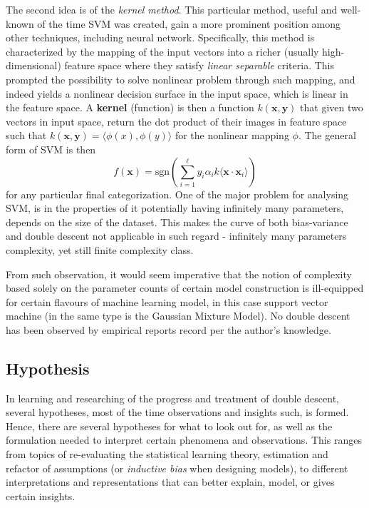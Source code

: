 \documentclass[10pt]{article} %
\begin{document}
The second idea is of the \textit{kernel method}. This particular method, useful and well-known of the time SVM was created, gain a more prominent position among other techniques, including neural network. Specifically, this method is characterized by the mapping of the input vectors into a richer (usually high-dimensional) feature space where they satisfy \textit{linear separable} criteria. This prompted the possibility to solve nonlinear problem through such mapping, and indeed yields a nonlinear decision surface in the input space, which is linear in the feature space. A \textbf{kernel} (function) is then a function $k(\mathbf{x},\mathbf{y})$ that given two vectors in input space, return the dot product of their images in feature space such that $k(\mathbf{x},\mathbf{y})=\langle \phi(x), \phi(y) \rangle$ for the nonlinear mapping $\phi$. The general form of SVM is then 
\begin{equation}
    f(\mathbf{x}) = \mathrm{sgn} \left(\sum^{\ell}_{i=1} y_{i}\alpha_{i}k\langle \mathbf{x}\cdot \mathbf{x}_{i} \rangle\right)
\end{equation}
for any particular final categorization. One of the major problem for analysing SVM, is in the properties of it potentially having infinitely many parameters, depends on the size of the dataset. This makes the curve of both bias-variance and double descent not applicable in such regard - infinitely many parameters complexity, yet still finite complexity class. 

From such observation, it would seem imperative that the notion of complexity based solely on the parameter counts of certain model construction is ill-equipped for certain flavours of machine learning model, in this case support vector machine (in the same type is the Gaussian Mixture Model). No double descent has been observed by empirical reports record per the author's knowledge. 


\clearpage

\subsection{Hypothesis}

In learning and researching of the progress and treatment of double descent, several hypotheses, most of the time observations and insights such, is formed. Hence, there are several hypotheses for what to look out for, as well as the formulation needed to interpret certain phenomena and observations. This ranges from topics of re-evaluating the statistical learning theory, estimation and refactor of assumptions (or \textit{inductive bias} when designing models), to different interpretations and representations that can better explain, model, or gives certain insights.  
\end{document}
